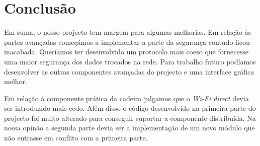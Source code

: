 \section{Conclusão}
Em suma, o nosso projecto tem margem para algumas melhorias. Em relação às partes avançadas começámos a implementar a parte da segurança contudo ficou inacabada. Queríamos ter desenvolvido um protocolo mais coeso que fornecesse uma maior segurança dos dados trocados na rede. Para trabalho futuro podíamos desenvolver as outras componentes avançadas do projecto e uma interface gráfica melhor.

Em relação à componente prática da cadeira julgamos que o \textit{Wi-Fi direct} devia ser introduzido mais cedo. Além disso o código desenvolvido na primeira parte do projecto foi muito alterado para conseguir suportar a componente distribuída. Na nossa opinão a segunda parte devia ser a implementação de um novo módulo que não entrasse em conflito com a primeira parte. 